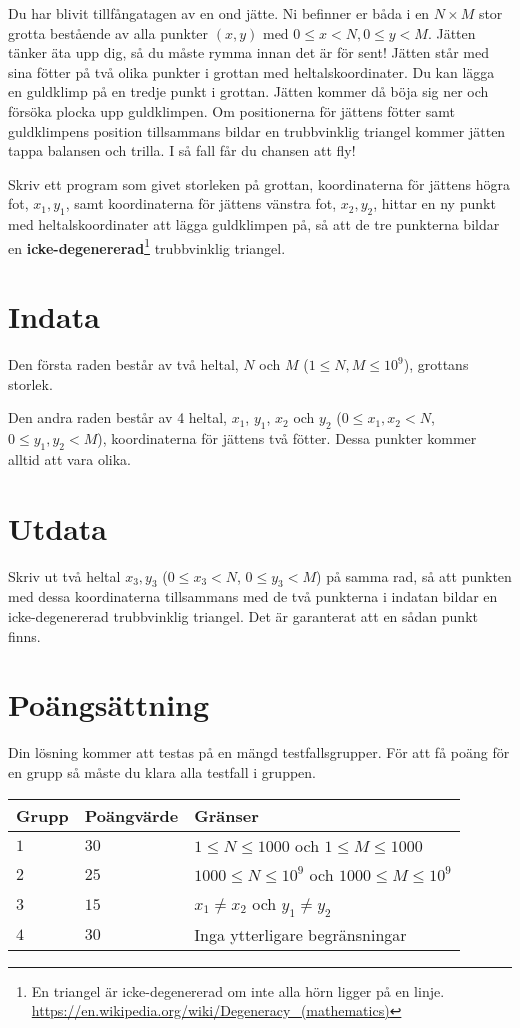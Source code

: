 \def\version{jury-3}
Du har blivit tillfångatagen av en ond jätte.
Ni befinner er båda i en $N \times M$ stor grotta bestående av alla punkter $(x, y)$ med $0 \le x < N, 0 \le y < M$.
Jätten tänker äta upp dig, så du måste rymma innan det är för sent!
Jätten står med sina fötter på två olika punkter i grottan med heltalskoordinater.
Du kan lägga en guldklimp på en tredje punkt i grottan.
Jätten kommer då böja sig ner och försöka plocka upp guldklimpen.
Om positionerna för jättens fötter samt guldklimpens position tillsammans bildar en trubbvinklig triangel kommer jätten tappa balansen och trilla.
I så fall får du chansen att fly!

Skriv ett program som givet storleken på grottan, koordinaterna för jättens högra fot, $x_1, y_1$, samt koordinaterna för jättens vänstra fot, $x_2, y_2$, hittar en ny punkt med heltalskoordinater att lägga guldklimpen på, så att de tre punkterna bildar en \textbf{icke-degenererad}\footnote{En triangel är icke-degenererad om inte alla hörn ligger på en linje. \url{https://en.wikipedia.org/wiki/Degeneracy_(mathematics)}} trubbvinklig triangel.

\section*{Indata}
Den första raden består av två heltal, $N$ och $M$ ($1\leq N, M \leq 10^9$), grottans storlek.

Den andra raden består av 4 heltal, $x_1$, $y_1$, $x_2$ och $y_2$ ($0\leq x_1, x_2 < N$, $0\leq y_1, y_2 < M$), koordinaterna för jättens två fötter.
Dessa punkter kommer alltid att vara olika.

\section*{Utdata}
Skriv ut två heltal $x_3, y_3$ ($0\leq x_3 < N$, $0\leq y_3 < M$) på samma rad, så att punkten med dessa koordinaterna tillsammans med de två punkterna i indatan bildar en icke-degenererad trubbvinklig triangel. Det är garanterat att en sådan punkt finns.

\section*{Poängsättning}
Din lösning kommer att testas på en mängd testfallsgrupper.
För att få poäng för en grupp så måste du klara alla testfall i gruppen.

\noindent
\begin{tabular}{| l | l | l |}
\hline
Grupp & Poängvärde & Gränser \\ \hline
$1$    & $30$         & $1\leq N \leq 1000$ och $1\leq M \leq 1000$ \\ \hline
$2$    & $25$          & $1000\leq N\leq 10^9$ och $1000\leq M \leq 10^9$ \\ \hline
$3$    & $15$          & $x_1 \neq x_2$ och $y_1 \neq y_2$ \\ \hline
$4$    & $30$         & Inga ytterligare begränsningar \\ \hline
\end{tabular}

